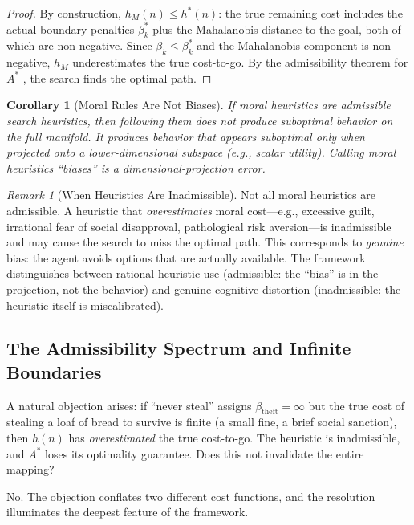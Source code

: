 \documentclass[12pt]{article}
\newtheorem{corollary}[theorem]{Corollary}
\theoremstyle{definition}
\theoremstyle{remark}
\newtheorem{remark}[theorem]{Remark}
\begin{document}
\begin{proof}
By construction, $h_M(n) \leq h^*(n)$: the true remaining cost includes the actual boundary penalties $\beta_k^*$ plus the Mahalanobis distance to the goal, both of which are non-negative.  Since $\beta_k \leq \beta_k^*$ and the Mahalanobis component is non-negative, $h_M$ underestimates the true cost-to-go.  By the admissibility theorem for $A^*$ \cite{hart1968}, the search finds the optimal path.
\end{proof}

\begin{corollary}[Moral Rules Are Not Biases]
\label{cor:not_biases}
If moral heuristics are admissible search heuristics, then following them does not produce suboptimal behavior \emph{on the full manifold}.  It produces behavior that appears suboptimal only when projected onto a lower-dimensional subspace (e.g., scalar utility).  Calling moral heuristics ``biases'' is a dimensional-projection error.
\end{corollary}

\begin{remark}[When Heuristics Are Inadmissible]
Not all moral heuristics are admissible.  A heuristic that \emph{overestimates} moral cost---e.g., excessive guilt, irrational fear of social disapproval, pathological risk aversion---is inadmissible and may cause the search to miss the optimal path.  This corresponds to \emph{genuine} bias: the agent avoids options that are actually available.  The framework distinguishes between rational heuristic use (admissible: the ``bias'' is in the projection, not the behavior) and genuine cognitive distortion (inadmissible: the heuristic itself is miscalibrated).
\end{remark}

\subsection{The Admissibility Spectrum and Infinite Boundaries}
\label{sec:admissibility_spectrum}

A natural objection arises: if ``never steal'' assigns $\beta_{\text{theft}} = \infty$ but the true cost of stealing a loaf of bread to survive is finite (a small fine, a brief social sanction), then $h(n)$ has \emph{overestimated} the true cost-to-go.  The heuristic is inadmissible, and $A^*$ loses its optimality guarantee.  Does this not invalidate the entire mapping?

No.  The objection conflates two different cost functions, and the resolution illuminates the deepest feature of the framework.
\end{document}
